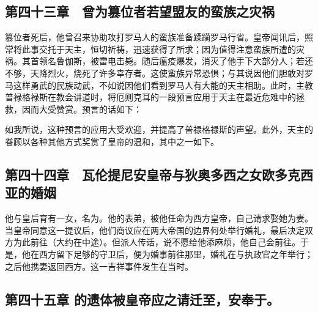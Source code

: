 
\subsection{第四十三章　曾为篡位者若望盟友的蛮族之灾祸}

篡位者死后，他曾召来协助攻打罗马人的蛮族准备蹂躏罗马行省。皇帝闻讯后，照常将此事交托于天主，恒切祈祷，迅速获得了所求；因为值得注意蛮族所遭的灾祸。其首领名鲁伽斯，被雷电击毙。随后瘟疫爆发，消灭了他手下大部分人；若还不够，天降烈火，烧死了许多幸存者。这使蛮族异常恐惧；与其说因他们胆敢对罗马这样勇武的民族动武，不如说因他们看到罗马人有大能的天主相助。此时，主教普禄格禄斯在教会讲道时，将厄则克耳的一段预言应用于天主在最近危难中的拯救，因而大受赞赏。预言的话如下：\par

\par

如我所说，这种预言的应用大受欢迎，并提高了普禄格禄斯的声望。此外，天主的眷顾以各种其他方式奖赏了皇帝的温和，其中之一如下。\par


\subsection{第四十四章　瓦伦提尼安皇帝与狄奥多西之女欧多克西亚的婚姻}

他与皇后育有一女，名为。他的表弟，被他任命为西方皇帝，自己请求娶她为妻。当皇帝同意这一提议后，他们商议应在两大帝国的边界何处举行婚礼，最后决定双方为此前往（大约在中途）。但派人传话，说不愿给他添麻烦，他自己会前往。于是，他在西方留下足够的守卫后，便为婚事前往那里，婚礼在与执政官之年举行；之后他携妻返回西方。这一吉祥事件发生在当时。\par


\subsection{第四十五章 的遗体被皇帝应之请迁至，安奉于。}

